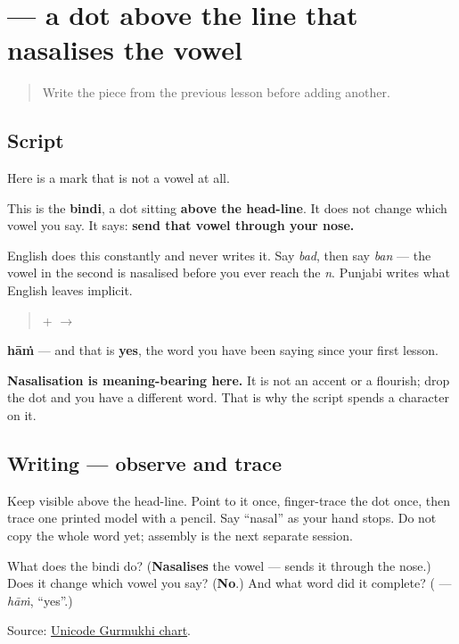 \section[\texorpdfstring{\pa{ਂ} (-ṁ)}{ਂ (-ṁ)}]{ — a dot above the line that nasalises the vowel}

\label{lesson:PA-W01-bindi}



\begin{quote}
Write the piece from the previous lesson before adding another.
\end{quote}

\subsection*{Script}
Here is a mark that is not a vowel at all.

\begin{quote}
\end{quote}

This is the \textbf{bindi}, a dot sitting \textbf{above the head-line}. It does not change which vowel you say. It says: \textbf{send that vowel through your nose.}

English does this constantly and never writes it. Say \emph{bad}, then say \emph{ban} — the vowel in the second is nasalised before you ever reach the \emph{n}. Punjabi writes what English leaves implicit.

\begin{quote}
\textbf{} + \textbf{} $\to$ \textbf{}
\end{quote}

\textbf{hāṁ} — and that is \textbf{yes}, the word you have been saying since your first lesson.

\textbf{Nasalisation is meaning-bearing here.} It is not an accent or a flourish; drop the dot and you have a different word. That is why the script spends a character on it.

\subsection*{Writing — observe and trace}
Keep \textbf{} visible above the head-line. Point to it once, finger-trace the dot once, then trace one printed model with a pencil. Say “nasal” as your hand stops. Do not copy the whole word yet; assembly is the next separate session.

\begin{tcolorbox}[breakable,colback=teal!4,colframe=teal!35!black,title={Before you move on}]
What does the bindi do? (\textbf{Nasalises} the vowel — sends it through the nose.) Does it change which vowel you say? (\textbf{No}.) And what word did it complete? (\textbf{} — \emph{hāṁ}, \textquotedblleft{}yes\textquotedblright{}.)

Source: \href{https://www.unicode.org/charts/PDF/U0A00.pdf}{Unicode Gurmukhi chart}.
\end{tcolorbox}
